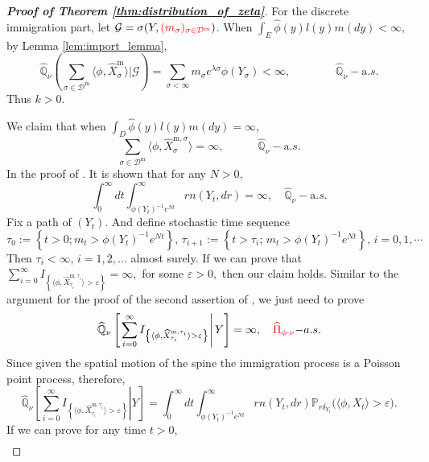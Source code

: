\documentclass[12pt,a4paper]{amsart}
\numberwithin{equation}{section}
\theoremstyle{plain}
\theoremstyle{definition}
\begin{document}
\begin{proof}[{\bf Proof of Theorem \ref{thm:distribution_of_zeta}}]
	For the discrete immigration part, let $\mathcal G=\sigma(Y, {\color{red}( m_\sigma)_{\sigma\in\mathcal D^{\mathrm m}}})$.  When  $\int_E\widehat{\phi}(y)l(y)m(dy)<\infty$, by Lemma \ref{lem:import_lemma},
  \[
    \widehat{\mathbb Q}_{\nu}\left(\sum_{\sigma\in \mathcal D^{\mathrm m}}\langle \phi, \widehat X_{\sigma}^{{\mathrm m}}\rangle\Big|\mathcal G \right)
    =\sum_{\sigma<\infty}m_\sigma e^{\lambda \sigma}\phi(Y_{\sigma})<\infty,  \qquad\qquad \widehat{\mathbb Q}_{\nu}-{\mathrm a.s.}
  \]
	Thus $k>0$.

	We claim that when $\int_D\widehat\phi(y)l(y)m(dy)=\infty$,
  \begin{equation}\label{eq:infty}
    \sum_{\sigma\in \mathcal D^{\mathrm m}}\langle \phi, \widehat X_{\sigma}^{{\mathrm m},\sigma}\rangle =\infty,\quad\qquad  \widehat{\mathbb Q}_\nu-{\mathrm a.s.}
  \end{equation}
	In the proof of \cite[Lemma $3.2$]{LiuRenSong2009Log}.  It is shown that for any $N>0$,
  \begin{equation}\label{eq:inf}
    \int_0^\infty dt\int_{\phi(Y_t)^{-1}e^{Nt}}^\infty rn(Y_t,dr)
    =\infty,\quad \widehat{\mathbb Q}_\nu-{\mathrm a.s.}
  \end{equation}
	Fix a path of $(Y_t)$.  And define stochastic
	time sequence
  \[
    \tau_0:=\left\{t>0; m_t>\phi(Y_t)^{-1}e^{Nt}\right\},\,
    \tau_{i+1}:=\left\{t>\tau_i;\, m_t>\phi(Y_t)^{-1}e^{Nt}\right\},\, i=0,1,\cdots
  \]
	Then $\tau_i<\infty$, $i=1,2,\ldots$ almost surely.
	If we can prove that $\sum_{i=0}^\infty I_{\left\{\langle\phi, \widehat X^{{\mathrm m},\tau_i}_{\tau_i}\rangle  >\varepsilon\right\}}=\infty,$ for some $\varepsilon>0,$ then our claim holds.  Similar to the argument for the proof of the second assertion of \cite[Lemma $2.2$]{LiuRenSong2009Log}, we just need to prove
  \[
    \widehat{\mathbb Q}_\nu
    \left[\left.\sum_{i=0}^\infty I_{\left\{\langle\phi, \widehat X^{{\mathrm m},\tau_i}_{\tau_i}\rangle  >\varepsilon\right\}} \right| Y\right]=\infty,\quad {\color{red}\widehat\Pi_{\phi\cdot\nu}}{\mathrm -a.s.}
  \]
	Since given the spatial motion of the spine the immigration process is a Poisson point process, therefore,
  \[
    \widehat{\mathbb Q}_\nu\left[\left.\sum_{i=0}^\infty I_{\left\{\langle\phi, \widehat X^{{\mathrm m},\tau_i}_{\tau_i}\rangle  >\varepsilon\right\}}\right| Y\right]=\int_0^\infty dt\int_{\phi(Y_t)^{-1}e^{Nt}}^\infty rn(Y_t, dr)\mathbb{P}_{r\delta_{Y_t}}\big(\langle\phi, X_t \rangle >\varepsilon\big).
  \]
	If we can prove for any time $t>0$,
  \begin{eqnarray}\label{eq:last_point}

\end{eqnarray}
\end{proof}
\end{document}
